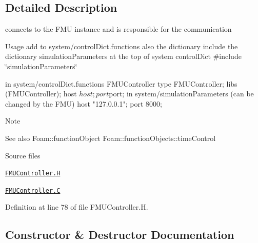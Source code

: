 \subsection{Detailed Description}
connects to the F\+MU instance and is responsible for the communication 

\label{_Description}%
 \begin{DoxyParagraph}{Usage}
add to system/control\+Dict.\+functions also the dictionary include the dictionary simulation\+Parameters at the top of system control\+Dict \#include \char`\"{}simulation\+Parameters\char`\"{}
\end{DoxyParagraph}
\begin{DoxyVerb}in system/controlDict.functions
FMUController
{
    type            FMUController;
    libs            (FMUController);
    host            $host;
    port            $port;
}
in system/simulationParameters (can be changed by the FMU)
host            "127.0.0.1";
port            8000;\end{DoxyVerb}


\begin{DoxyNote}{Note}

\end{DoxyNote}
\begin{DoxySeeAlso}{See also}
Foam\+::function\+Object Foam\+::function\+Objects\+::time\+Control
\end{DoxySeeAlso}
\begin{DoxyParagraph}{Source files}

\begin{DoxyItemize}
\item \href{../../../home/carlo/data/GeN-Foam/GeN-Foam_ffn/GeN-Foam/GeN-Foam/FMU4FOAM/src/OF_FMU/FMU/FMUController.H}{\tt F\+M\+U\+Controller.\+H} 
\item \href{../../../home/carlo/data/GeN-Foam/GeN-Foam_ffn/GeN-Foam/GeN-Foam/FMU4FOAM/src/OF_FMU/FMU/FMUController.C}{\tt F\+M\+U\+Controller.\+C} 
\end{DoxyItemize}
\end{DoxyParagraph}


Definition at line 78 of file F\+M\+U\+Controller.\+H.



\subsection{Constructor \& Destructor Documentation}
\mbox{\label{classFoam_1_1functionObjects_1_1FMUController_ab54bd00b9477b72cc7db959c8c7f538d}} 
